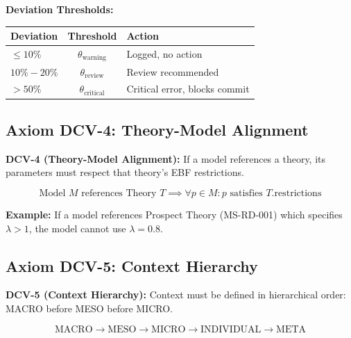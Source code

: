 \textbf{Deviation Thresholds:}

\begin{center}
\begin{tabular}{lcl}
\toprule
\textbf{Deviation} & \textbf{Threshold} & \textbf{Action} \\
\midrule
$\leq 10\%$ & $\theta_{\text{warning}}$ & Logged, no action \\
$10\% - 20\%$ & $\theta_{\text{review}}$ & Review recommended \\
$> 50\%$ & $\theta_{\text{critical}}$ & Critical error, blocks commit \\
\bottomrule
\end{tabular}
\end{center}

\subsection{Axiom DCV-4: Theory-Model Alignment}

\begin{tcolorbox}[colback=blue!5!white, colframe=blue!75!black]
\textbf{DCV-4 (Theory-Model Alignment):} If a model references a theory, its parameters must respect that theory's EBF restrictions.

\begin{equation}
\text{Model } M \text{ references Theory } T \implies \forall p \in M: p \text{ satisfies } T.\text{restrictions}
\end{equation}
\end{tcolorbox}

\textbf{Example:} If a model references Prospect Theory (MS-RD-001) which specifies $\lambda > 1$, the model cannot use $\lambda = 0.8$.

\subsection{Axiom DCV-5: Context Hierarchy}

\begin{tcolorbox}[colback=blue!5!white, colframe=blue!75!black]
\textbf{DCV-5 (Context Hierarchy):} Context must be defined in hierarchical order: MACRO before MESO before MICRO.

\begin{equation}
\text{MACRO} \to \text{MESO} \to \text{MICRO} \to \text{INDIVIDUAL} \to \text{META}
\end{equation}
\end{tcolorbox}

